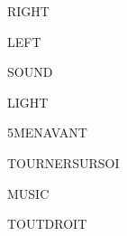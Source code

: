 \documentclass{article}
\begin{document}
    \begin{figure}
        \centering
        
        \caption{RIGHT}

    \end{figure}
   
    \begin{figure}
        \centering
        
        \caption{LEFT}
    \end{figure}

    \begin{figure}
        \centering
        
        \caption{SOUND}
    \end{figure}

    \begin{figure}
        \centering
        
        \caption{LIGHT}
    \end{figure}

    \begin{figure}
        \centering
        
        \caption{5MENAVANT}
    \end{figure}    

    \begin{figure}
        \centering
        
        \caption{TOURNERSURSOI}
    \end{figure}

    \begin{figure}
        \centering
        
        \caption{MUSIC}
    \end{figure}

    \begin{figure}
        \centering
        
        \caption{TOUTDROIT}
    \end{figure}

    
\end{document}
